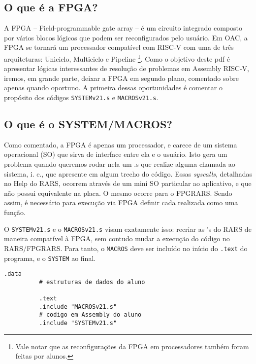 \documentclass[10pt, a4paper, twoside]{article}
\begin{document}
    \subsection{O que é a FPGA?}
        A FPGA -- Field-programmable gate array -- é um circuito integrado composto por vários blocos lógicos que podem ser reconfigurados pelo usuário.
        Em OAC, a FPGA se tornará um processador compatível com RISC-V com uma de três arquiteturas: 
        Uniciclo, Multiciclo e Pipeline
        \footnote{%
            Vale notar que as reconfigurações da FPGA em processadores também foram feitas por alunos.
        }.
        Como o objetivo deste pdf é apresentar lógicas interessantes de resolução de problemas em Assembly RISC-V, iremos, em grande parte, deixar a FPGA em segundo plano, comentado sobre apenas quando oportuno.
        A primeira dessas oportunidades é comentar o propósito dos códigos {\tt SYSTEMv21.s} e {\tt MACROSv21.s}.
        
        
    \subsection{O que é o SYSTEM/MACROS?}
        Como comentado, a FPGA é apenas um processador, e carece de um sistema operacional (SO) que sirva de interface entre ela e o usuário.
        Isto gera um problema quando queremos rodar nela um .s que realize alguma chamada ao sistema, i. e., que apresente \ecall em algum trecho do código.
        Essas \textit{syscalls}, detalhadas no Help do RARS, ocorrem através de um mini SO particular ao aplicativo, e que não possui equivalente na placa. 
        O mesmo ocorre para o FPGRARS. 
        Sendo assim, é necessário para execução via FPGA definir cada \ecall realizada como uma função.
        
        O {\tt SYSTEMv21.s} e o {\tt MACROSv21.s} visam exatamente isso:
        recriar as \ecall's do RARS de maneira compatível à FPGA, sem contudo mudar a execução do código no RARS/FPGRARS. 
        Para tanto, o {\tt MACROS} deve ser incluído no início do {\tt .text} do programa, e o {\tt SYSTEM} ao final.
        \begin{lstlisting}[caption=Forma geral do uso do {\tt SYSTEMv21.s} e {\tt MACROSv21.s}]
          .data
          # estruturas de dados do aluno
          
          .text
          .include "MACROSv21.s"
          # codigo em Assembly do aluno
          .include "SYSTEMv21.s"
        \end{lstlisting}
        
\end{document}
